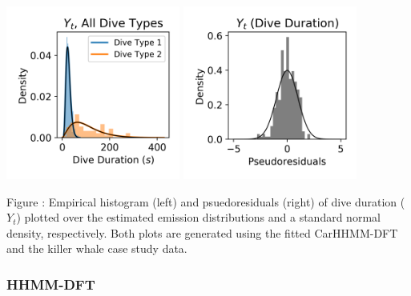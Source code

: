 \documentclass{article}
\begin{document}
        \begin{center}
        \includegraphics[width=2.25in]{../Plots/CarHHMM2_empirical_hist_dive_duration.png}
        \includegraphics[width=2.25in]{../Plots/CarHHMM2_psedoresids_Dive_Duration.png}
        \end{center}
        
        \noindent Figure : Empirical histogram (left) and psuedoresiduals (right) of dive duration ($Y_{t}$) plotted over the estimated emission distributions and a standard normal density, respectively. Both plots are generated using the fitted CarHHMM-DFT and the killer whale case study data.
        \addtocounter{fignum}{1}
        
        \subsubsection{HHMM-DFT}
        
\end{document}
